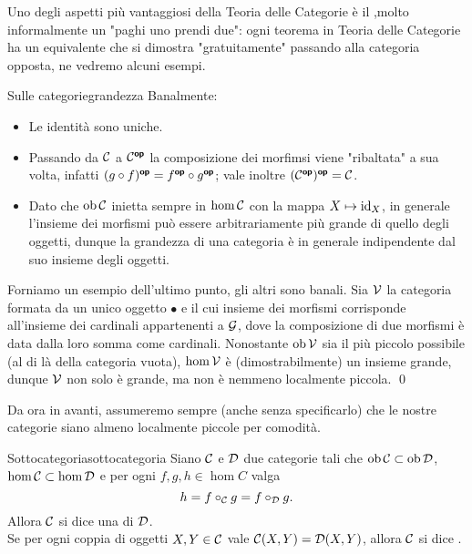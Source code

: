 \documentclass{article}
\renewcommand\C{\mc{C}}
\newcommand\D{\mc{D}}
\begin{document}
Uno degli aspetti più vantaggiosi della Teoria delle Categorie è il ,molto informalmente un "paghi uno prendi due": ogni teorema in Teoria delle Categorie ha un equivalente che si dimostra "gratuitamente" passando alla categoria opposta, ne vedremo alcuni esempi.

\begin{remark}{Sulle categorie}{grandezza}
    Banalmente:\begin{itemize}
        \item Le identità sono uniche.
        \item Passando da $\C$ a $\C^\op$ la composizione dei morfimsi viene "ribaltata" a sua volta, infatti $(g\circ f)^{\text{\sffamily\textbf{op}}} = f^{\text{\sffamily\textbf{op}}}\circ g^{\text{\sffamily\textbf{op}}}$; vale inoltre $(\C^\op)^\op = \C$.
        \item Dato che $\ob\C$ inietta sempre in $\hom\C$ con la mappa $X\mapsto \operatorname{id}_X$, in generale l'insieme dei morfismi può essere arbitrariamente più grande di quello degli oggetti, dunque la grandezza di una categoria è in generale indipendente dal suo insieme degli oggetti.
    \end{itemize} 
    \proof 
    Forniamo un esempio dell'ultimo punto, gli altri sono banali. Sia $\mathcal{V}$ la categoria formata da un unico oggetto $\bullet$ e il cui insieme dei morfismi corrisponde all'insieme dei cardinali appartenenti a $\mathcal{G}$, dove la composizione di due morfismi è data dalla loro somma come cardinali. Nonostante $\operatorname{ob}\mathcal{V}$ sia il più piccolo possibile (al di là della categoria vuota), $\hom \mathcal{V}$ è (dimostrabilmente) un insieme grande, dunque $\mathcal{V}$ non solo è grande, ma non è nemmeno localmente piccola.
    \qed
\end{remark}

Da ora in avanti, assumeremo sempre (anche senza specificarlo) che le nostre categorie siano almeno localmente piccole per comodità.

\begin{definition}{Sottocategoria}{sottocategoria}
    Siano $\C$ e $\D$ due categorie tali che $\ob\C \subset \ob\D$, $\hom\C \subset \hom\D$ e per ogni $f,g,h \in \hom C$ valga 
    \[h = f\circ_\C g = f\circ_\D g.\]
    Allora $\C$ si dice una  di $\D$.\\
    Se per ogni coppia di oggetti $X,Y \in \C$ vale $\C(X,Y)=\D(X,Y)$, allora $\C$ si dice .
\end{definition}
\end{document}
